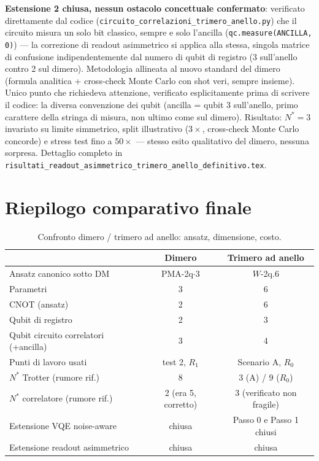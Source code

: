 \documentclass[11pt,a4paper]{article}
\begin{document}

\textbf{Estensione 2 chiusa, nessun ostacolo concettuale confermato}:
verificato direttamente dal codice (\texttt{circuito\_correlazioni\_trimero\_anello.py})
che il circuito misura un solo bit classico, sempre e solo l'ancilla
(\texttt{qc.measure(ANCILLA, 0)}) --- la correzione di readout asimmetrico si
applica alla stessa, singola matrice di confusione indipendentemente dal
numero di qubit di registro (3 sull'anello contro 2 sul dimero). Metodologia
allineata al nuovo standard del dimero (formula analitica + cross-check
Monte Carlo con shot veri, sempre insieme). Unico punto che richiedeva
attenzione, verificato esplicitamente prima di scrivere il codice: la
diversa convenzione dei qubit (ancilla = qubit 3 sull'anello, primo
carattere della stringa di misura, non ultimo come sul dimero). Risultato:
$N^*=3$ invariato su limite simmetrico, split illustrativo ($3\times$,
cross-check Monte Carlo concorde) e stress test fino a $50\times$ ---
stesso esito qualitativo del dimero, nessuna sorpresa. Dettaglio completo
in \texttt{risultati\_readout\_asimmetrico\_trimero\_anello\_definitivo.tex}.


\section{Riepilogo comparativo finale}

\begin{table}[htbp]
\centering
\caption{Confronto dimero / trimero ad anello: ansatz, dimensione, costo.}
\label{tab:confronto-finale}
\begin{tabular}{lcc}
\toprule
& Dimero & Trimero ad anello \\
\midrule
Ansatz canonico sotto DM & PMA-2q$\cdot$3 & $W$-2q.6 \\
Parametri & 3 & 6 \\
CNOT (ansatz) & 2 & 6 \\
Qubit di registro & 2 & 3 \\
Qubit circuito correlatori (+ancilla) & 3 & 4 \\
Punti di lavoro usati & test 2, $R_1$ & Scenario A, $R_0$ \\
$N^*$ Trotter (rumore rif.) & 8 & $3$ (A) / $9$ ($R_0$) \\
$N^*$ correlatore (rumore rif.) & 2 (era 5, corretto) & 3 (verificato non fragile) \\
Estensione VQE noise-aware & chiusa & Passo 0 e Passo 1 chiusi \\
Estensione readout asimmetrico & chiusa & chiusa \\
\bottomrule
\end{tabular}
\end{table}
\end{document}
